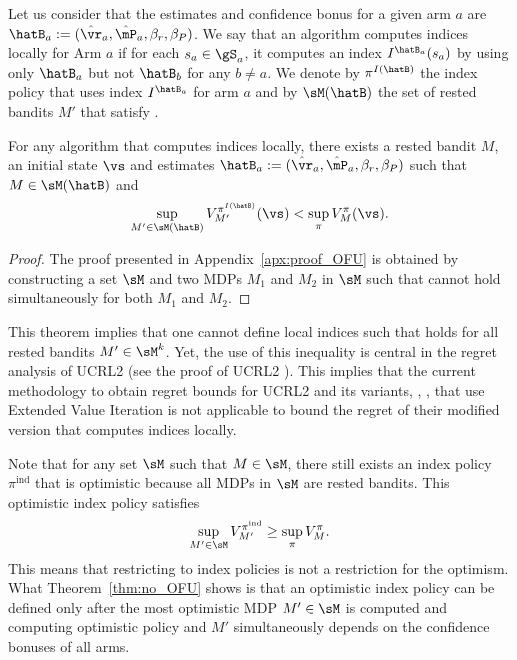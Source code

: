 Let us consider that the estimates and confidence bonus for a given arm $a$ are $\hatB_a:=(\hat{\vr}_a,\hat{\mP}_a,\beta_{r},\beta_{P})$. We say that an algorithm computes indices locally for Arm $a$ if for each $s_a\in\gS_a$, it computes an index $I^{\hatB_a}(s_a)$ by using only $\hatB_a$ but not $\hatB_{b}$ for any $b\ne a$. We denote by $\pi^{I(\hatB)}$ the index policy that uses index $I^{\hatB_a}$ for arm $a$ and by $\sM(\hatB)$ the set of rested bandits $M'$ that satisfy .
\begin{thm}
    \label{thm:no_OFU}
    For any algorithm that computes indices locally, there exists a rested bandit $M$, an initial state $\vs$ and estimates $\hatB_a:=(\hat{\vr}_a,\hat{\mP}_a, \beta_r, \beta_P)$ such that $M\in\sM(\hatB)$ and
    \begin{align*}
        \sup_{M'\in\sM(\hatB)}V^{\pi^{I(\hatB)}}_{M'}(\vs) < \sup_\pi V^{\pi}_{M}(\vs).
    \end{align*}
\end{thm}
\begin{proof}
    The proof presented in Appendix~\ref{apx:proof_OFU} is obtained by constructing a set $\sM$ and two MDPs $M_1$ and $M_2$ in $\sM$ such that  cannot hold simultaneously for both $M_1$ and $M_2$. 
\end{proof}
This theorem implies that one cannot define local indices such that  holds for all rested bandits $M'\in\sM^k$. Yet, the use of this inequality is central in the regret analysis of UCRL2 (see the proof of UCRL2 \cite{jaksch2010near}). This implies that the current methodology to obtain regret bounds for UCRL2 and its variants, \eg, \cite{bourel2020tightening,fruit2018efficient,talebi2018variance,filippi2010optimism}, that use Extended Value Iteration is not applicable to bound the regret of their modified version that computes indices locally. 

Note that for any set $\sM$ such that $M \in \sM$, there still exists an index policy $\pi^{\mathrm{ind}}$ that is optimistic because all MDPs in $\sM$ are rested bandits. This optimistic index policy satisfies
\begin{align*}
  \sup_{M'\in\sM}V^{\pi^{\mathrm{ind}}}_{M'} \ge \sup_\pi V^{\pi}_{M}.
\end{align*}
This means that restricting to index policies is not a restriction for the optimism. What Theorem~\ref{thm:no_OFU} shows is that an optimistic index policy can be defined only after the most optimistic MDP $M'\in\sM$ is computed and computing optimistic policy and $M'$ simultaneously depends on the confidence bonuses of all arms.

